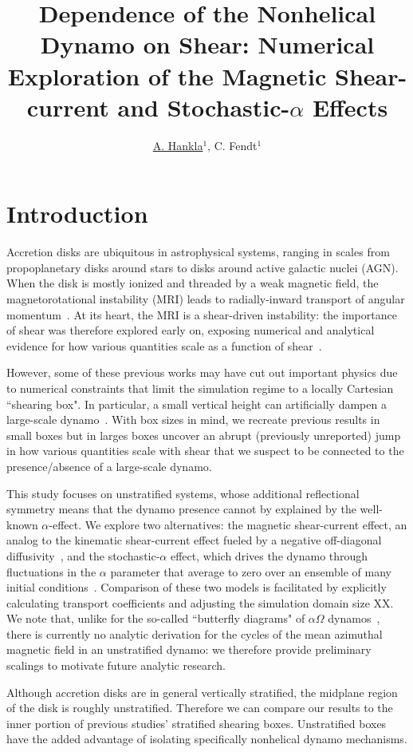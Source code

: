 \documentclass{epsconf}
\title{Dependence of the Nonhelical Dynamo on Shear: Numerical Exploration of the Magnetic Shear-current and Stochastic-$\alpha$ Effects}
\author{\underline{A. Hankla}$^1$, C. Fendt$^1$}
\institute{$^1$ Max Planck Institute for Astronomy, Heidelberg, Germany}
\begin{document}
\maketitle

\section{Introduction}
Accretion disks are ubiquitous in astrophysical systems, ranging in scales from propoplanetary disks around stars to disks around active galactic nuclei (AGN). When the disk is mostly ionized and threaded by a weak magnetic field, the magnetorotational instability (MRI) leads to radially-inward transport of angular momentum~\cite{bh91}. At its heart, the MRI is a shear-driven instability: the importance of shear was therefore explored early on, exposing numerical and analytical evidence for how various quantities scale as a function of shear~\cite{abl96}.

However, some of these previous works may have cut out important physics due to numerical constraints that limit the simulation regime to a locally Cartesian ``shearing box". In particular, a small vertical height can artificially dampen a large-scale dynamo~\cite{SSH16}. With box sizes in mind, we recreate previous results in small boxes but in larges boxes uncover an abrupt (previously unreported) jump in how various quantities scale with shear that we suspect to be connected to the presence/absence of a large-scale dynamo. 

This study focuses on unstratified systems, whose additional reflectional symmetry means that the dynamo presence cannot by explained by the well-known $\alpha$-effect. We explore two alternatives: the magnetic shear-current effect, an analog to the kinematic shear-current effect fueled by a negative off-diagonal diffusivity~\cite{SB16}, and the stochastic-$\alpha$ effect, which drives the dynamo through fluctuations in the $\alpha$ parameter that average to zero over an ensemble of many initial conditions~\cite{hms11}. Comparison of these two models is facilitated by explicitly calculating transport coefficients and adjusting the simulation domain size XX. We note that, unlike for the so-called ``butterfly diagrams" of $\alpha\Omega$ dynamos~\cite{GP15}, there is currently no analytic derivation for the cycles of the mean azimuthal magnetic field in an unstratified dynamo: we therefore provide preliminary scalings to motivate future analytic research.

Although accretion disks are in general vertically stratified, the midplane region of the disk is roughly unstratified. Therefore we can compare our results to the inner portion of previous studies' stratified shearing boxes. Unstratified boxes have the added advantage of isolating specifically nonhelical dynamo mechanisms.
\end{document}
